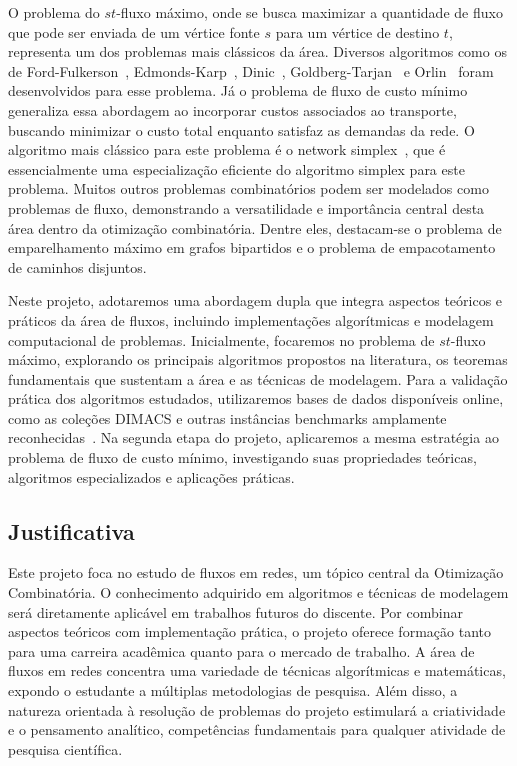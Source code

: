 \documentclass{amsart}
\begin{document}
O problema do \(st\)-fluxo máximo, onde se busca maximizar a quantidade de fluxo que pode ser enviada de um vértice fonte \(s\) para um vértice de destino \(t\), representa um dos problemas mais clássicos da área. Diversos algoritmos como os de Ford-Fulkerson~\cite{ford1956maximal}, Edmonds-Karp~\cite{edmonds1972theoretical}, Dinic~\cite{dinic1970algorithm}, Goldberg-Tarjan~\cite{goldberg1988new} e Orlin~\cite{orlin2013max} foram desenvolvidos para esse problema. Já o problema de fluxo de custo mínimo generaliza essa abordagem ao incorporar custos associados ao transporte, buscando minimizar o custo total enquanto satisfaz as demandas da rede. O algoritmo mais clássico para este problema é o network simplex~\cite{dantzig1951application,ahuja1993network}, que é essencialmente uma especialização eficiente do algoritmo simplex para este problema.
Muitos outros problemas combinatórios podem ser modelados como problemas de fluxo, demonstrando a versatilidade e importância central desta área dentro da otimização combinatória. Dentre eles, destacam-se o problema de emparelhamento máximo em grafos bipartidos e o problema de empacotamento de caminhos disjuntos.

Neste projeto, adotaremos uma abordagem dupla que integra aspectos teóricos e práticos da área de fluxos, incluindo implementações algorítmicas e modelagem computacional de problemas. Inicialmente, focaremos no problema de \(st\)-fluxo máximo, explorando os principais algoritmos propostos na literatura, os teoremas fundamentais que sustentam a área e as técnicas de modelagem. Para a validação prática dos algoritmos estudados, utilizaremos bases de dados disponíveis online, como as coleções DIMACS e outras instâncias benchmarks amplamente reconhecidas~\cite{Jensen2022}. Na segunda etapa do projeto, aplicaremos a mesma estratégia ao problema de fluxo de custo mínimo, investigando suas propriedades teóricas, algoritmos especializados e aplicações práticas.

\subsection{Justificativa}
Este projeto foca no estudo de fluxos em redes, um tópico central da Otimização Combinatória.
O conhecimento adquirido em algoritmos e técnicas de modelagem será diretamente aplicável em trabalhos futuros do discente. Por combinar aspectos teóricos com implementação prática, o projeto oferece formação tanto para uma carreira acadêmica quanto para o mercado de trabalho. A área de fluxos em redes concentra uma variedade de técnicas algorítmicas e matemáticas, expondo o estudante a múltiplas metodologias de pesquisa. Além disso, a natureza orientada à resolução de problemas do projeto estimulará a criatividade e o pensamento analítico, competências fundamentais para qualquer atividade de pesquisa científica.
\end{document}
